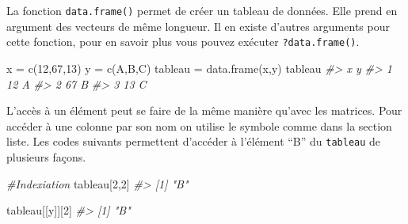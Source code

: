 \documentclass[
]{book}
\newenvironment{Shaded}{\begin{snugshade}}{\end{snugshade}}
\newcommand{\CommentTok}[1]{\textcolor[rgb]{0.56,0.35,0.01}{\textit{#1}}}
\newcommand{\DecValTok}[1]{\textcolor[rgb]{0.00,0.00,0.81}{#1}}
\newcommand{\FunctionTok}[1]{\textcolor[rgb]{0.00,0.00,0.00}{#1}}
\newcommand{\NormalTok}[1]{#1}
\newcommand{\OtherTok}[1]{\textcolor[rgb]{0.56,0.35,0.01}{#1}}
\newcommand{\SpecialCharTok}[1]{\textcolor[rgb]{0.00,0.00,0.00}{#1}}
\newcommand{\StringTok}[1]{\textcolor[rgb]{0.31,0.60,0.02}{#1}}
\begin{document}
La fonction \texttt{data.frame()} permet de créer un tableau de données. Elle prend en argument des vecteurs de même longueur. Il en existe d'autres arguments pour cette fonction, pour en savoir plus vous pouvez exécuter \texttt{?data.frame()}.

\begin{Shaded}
\begin{Highlighting}[]
\NormalTok{x }\OtherTok{=} \FunctionTok{c}\NormalTok{(}\DecValTok{12}\NormalTok{,}\DecValTok{67}\NormalTok{,}\DecValTok{13}\NormalTok{)}
\NormalTok{y }\OtherTok{=} \FunctionTok{c}\NormalTok{(}\StringTok{\textquotesingle{}A\textquotesingle{}}\NormalTok{,}\StringTok{\textquotesingle{}B\textquotesingle{}}\NormalTok{,}\StringTok{\textquotesingle{}C\textquotesingle{}}\NormalTok{)}
\NormalTok{tableau }\OtherTok{=} \FunctionTok{data.frame}\NormalTok{(x,y)}
\NormalTok{tableau}
\CommentTok{\#\textgreater{}    x y}
\CommentTok{\#\textgreater{} 1 12 A}
\CommentTok{\#\textgreater{} 2 67 B}
\CommentTok{\#\textgreater{} 3 13 C}
\end{Highlighting}
\end{Shaded}

L'accès à un élément peut se faire de la même manière qu'avec les matrices. Pour accéder à une colonne par son nom on utilise le symbole comme dans la section liste. Les codes suivants permettent d'accéder à l'élément ``B'' du \texttt{tableau} de plusieurs façons.

\begin{Shaded}
\begin{Highlighting}[]
\CommentTok{\#Indexiation}
\NormalTok{tableau[}\DecValTok{2}\NormalTok{,}\DecValTok{2}\NormalTok{]}
\CommentTok{\#\textgreater{} [1] "B"}
\end{Highlighting}
\end{Shaded}

\begin{Shaded}
\end{Shaded}

\begin{Shaded}
\begin{Highlighting}[]
\NormalTok{tableau[[}\StringTok{\textquotesingle{}y\textquotesingle{}}\NormalTok{]][}\DecValTok{2}\NormalTok{]}
\CommentTok{\#\textgreater{} [1] "B"}
\end{Highlighting}
\end{Shaded}
\end{document}
